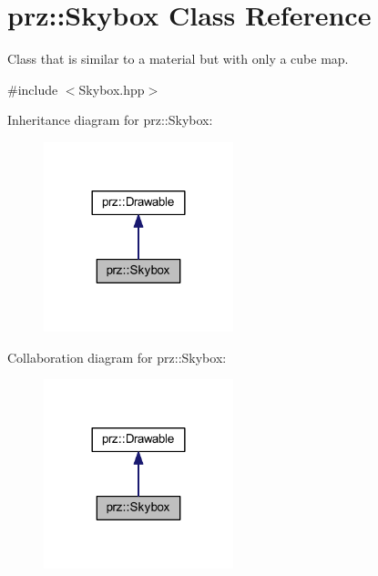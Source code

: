 \hypertarget{classprz_1_1_skybox}{}\section{prz\+::Skybox Class Reference}
\label{classprz_1_1_skybox}


Class that is similar to a material but with only a cube map.  




{\ttfamily \#include $<$Skybox.\+hpp$>$}



Inheritance diagram for prz\+::Skybox\+:
\nopagebreak
\begin{figure}[H]
\begin{center}
\leavevmode
\includegraphics[width=156pt]{classprz_1_1_skybox__inherit__graph}
\end{center}
\end{figure}


Collaboration diagram for prz\+::Skybox\+:
\nopagebreak
\begin{figure}[H]
\begin{center}
\leavevmode
\includegraphics[width=156pt]{classprz_1_1_skybox__coll__graph}
\end{center}
\end{figure}
